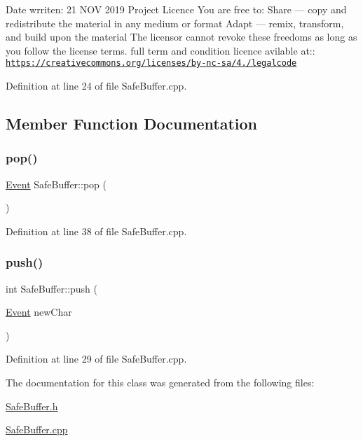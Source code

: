 Date wrriten\+: 21 N\+OV 2019 Project Licence You are free to\+: Share — copy and redistribute the material in any medium or format Adapt — remix, transform, and build upon the material The licensor cannot revoke these freedoms as long as you follow the license terms. full term and condition licence avilable at\+:\+: \href{https://creativecommons.org/licenses/by-nc-sa/4.0/legalcode}{\tt https\+://creativecommons.\+org/licenses/by-\/nc-\/sa/4./legalcode} 

Definition at line 24 of file Safe\+Buffer.\+cpp.



\subsection{Member Function Documentation}
\mbox{\label{class_safe_buffer_a90a33fca4d838f7c0eef6e8557f3c281}} 
\subsubsection{\texorpdfstring{pop()}{pop()}}
{\footnotesize\ttfamily \hyperlink{class_event}{Event} Safe\+Buffer\+::pop (\begin{DoxyParamCaption}{ }\end{DoxyParamCaption})}



Definition at line 38 of file Safe\+Buffer.\+cpp.

\mbox{\label{class_safe_buffer_ac3ed0799ec2e84c97e36b22c83f7abf5}} 
\subsubsection{\texorpdfstring{push()}{push()}}
{\footnotesize\ttfamily int Safe\+Buffer\+::push (\begin{DoxyParamCaption}\item[{\hyperlink{class_event}{Event}}]{new\+Char }\end{DoxyParamCaption})}



Definition at line 29 of file Safe\+Buffer.\+cpp.



The documentation for this class was generated from the following files\+:\begin{DoxyCompactItemize}
\item 
\hyperlink{_safe_buffer_8h}{Safe\+Buffer.\+h}\item 
\hyperlink{_safe_buffer_8cpp}{Safe\+Buffer.\+cpp}\end{DoxyCompactItemize}

